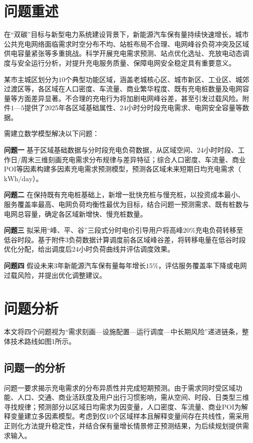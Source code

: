 \documentclass[a4paper,12pt]{ctexart}
\begin{document}
\tableofcontents
\newpage

\section{问题重述}
在“双碳”目标与新型电力系统建设背景下，新能源汽车保有量持续快速增长，城市公共充电网络面临需求时空分布不均、站桩布局不合理、电网峰谷负荷冲突及区域供电容量紧张等多重挑战。科学开展充电需求预测、站点优化选址、充放电动态调度与安全运行分析，对提升充电服务质量、保障电网安全稳定具有重要意义。

某市主城区划分为$10$个典型功能区域，涵盖老城核心区、城市新区、工业区、城郊过渡区等，各区域在人口密度、车流量、商业繁华程度、既有充电桩数量及电网容量等方面差异显著。不合理的充电行为将加剧电网峰谷差，甚至引发过载风险。附件$1$—$5$提供了2025年各区域基础属性、$24$小时分时段充电需求、电网安全容量等数据。

需建立数学模型解决以下问题：

\textbf{问题一} 基于区域基础数据与分时段充电负荷数据，从区域空间、$24$小时时段、工作日/周末三维刻画充电需求分布规律与差异特征；综合人口密度、车流量、商业POI等因素构建多因素充电需求预测模型，预测各区域未来短期日均充电需求（$\mathrm{kWh/day}$）。

\textbf{问题二} 在保持既有充电桩基础上，新增一批快充桩与慢充桩，以投资成本最小、服务覆盖率最高、电网负荷均衡性最优为目标，结合问题一预测需求、既有桩数与电网总容量，确定各区域新增快、慢充桩数量。

\textbf{问题三} 拟采用“峰、平、谷”三段式分时电价引导用户将高峰$20\%$充电负荷转移至低谷时段。基于附件$3$负荷数据计算调度前各区域峰谷差，将转移电量在低谷时段优化分配，给出调度后$24$小时负荷曲线并评估调度效果。

\textbf{问题四} 假设未来$3$年新能源汽车保有量每年增长$15\%$，评估服务覆盖率下降或电网过载风险，并提出优化调整建议。

\section{问题分析}
本文将四个问题视为“需求刻画—设施配置—运行调度—中长期风险”递进链条，整体技术路线如图1所示。


\subsection{问题一的分析}
问题一要求揭示充电需求的分布异质性并完成短期预测。由于需求同时受区域功能、人口、交通、商业活跃度及用户出行习惯影响，需从空间、时段、日类型三维寻找规律；预测部分以区域日均需求为因变量，人口密度、车流量、商业POI为解释变量建立多因素模型。考虑到仅$10$个区域样本且解释变量间存在共线性，需采用正则化方法提升稳定性，并结合保有量增长情景修正预测结果，为后续规划提供需求输入。
\end{document}
